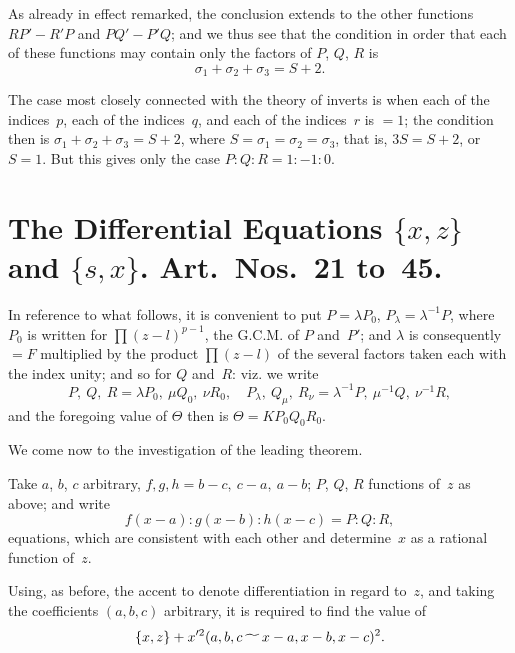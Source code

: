 \documentclass[11pt,a4paper]{book}
\begin{document}
\begin{art}
As already in effect remarked, the conclusion extends to the other functions
$RP' - R'P$ and $PQ' - P'Q$; and we thus see that the condition in order
that each of these functions may contain only the factors of $P$, $Q$, $R$ is
\[
\sigma_1 + \sigma_2 + \sigma_3 = S + 2.
\]
\end{art}

\begin{art}
The case most closely connected with the theory of inverts is when each
of the indices~$p$, each of the indices~$q$, and each of the indices~$r$ is
$=1$; the condition then is $\sigma_1 + \sigma_2 + \sigma_3 = S + 2$, where
$S = \sigma_1 = \sigma_2 = \sigma_3$, that is, $3S = S + 2$, or $S = 1$.
But this gives only the case $P : Q : R = 1 : -1 : 0$.
\end{art}

\section*{The Differential Equations $\{x, z\}$ and $\{s, x\}$.
Art.~Nos.~21 to~45.}

\begin{art}
In reference to what follows, it is convenient to put $P = \lambda P_0$,
$P_\lambda = \lambda^{-1} P$, where $P_0$ is written for $\prod (z-l)^{p-1}$, the
G.C.M. of $P$ and~$P'$; and $\lambda$ is consequently $= F$ multiplied by the
product $\prod (z-l)$ of the several factors taken each with the index
unity; and so for $Q$ and~$R$:
viz. we write
\[
P,\ Q,\ R = \lambda P_0,\ \mu Q_0,\ \nu R_0, \quad
P_\lambda,\ Q_\mu,\ R_\nu = \lambda^{-1}P,\ \mu^{-1}Q,\ \nu^{-1}R,
\]
and the foregoing value of $\Theta$ then is $\Theta = K P_0 Q_0 R_0$.

We come now to the investigation of the leading theorem.

Take $a$, $b$, $c$ arbitrary, $f, g, h = b-c,\ c-a,\ a-b$; $P$, $Q$, $R$
functions of~$z$ as above; and write
\[
f(x-a) : g(x-b) : h(x-c) = P : Q : R,
\]
equations, which are consistent with each other and determine~$x$ as a
rational function of~$z$.

Using, as before, the accent to denote differentiation in regard to~$z$,
and taking the coefficients $(a, b, c)$ arbitrary, it is required to find the
value of
\[
\{x, z\} + x'^2 (a, b, c \,\raisebox{-.5ex}{$\widetilde{\phantom{aa}}$}\, x-a, x-b, x-c)^2.
\]
\end{art}
\end{document}
